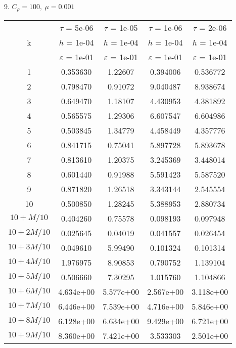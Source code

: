 9. $C_{\rho} = 100, \ \mu = 0.001$
\begin{center}
	\begin{tabular}{ |c|c|c|c|c| } 
		\hline
		& $\tau$ = 5e-06 & $\tau$ = 1e-05 & $\tau$ = 1e-06 & $\tau$ = 2e-06 \\ 
		k & $h$ = 1e-04 & $h$ = 1e-04 & $h$ = 1e-04 & $h$ = 1e-04 \\ 
		& $\varepsilon$ = 1e-01 & $\varepsilon$ = 1e-01 & $\varepsilon$ = 1e-01 & $\varepsilon$ = 1e-01 \\ 
		\hline
		1 & 0.353630 & 1.22607 & 0.394006 & 0.536772 \\
		\hline
		2 & 0.798470 & 0.91072 & 9.040487 & 8.938674 \\
		\hline
		3 & 0.649470 & 1.18107 & 4.430953 & 4.381892 \\
		\hline
		4 & 0.565575 & 1.29306 & 6.607547 & 6.604986 \\
		\hline
		5 & 0.503845 & 1.34779 & 4.458449 & 4.357776 \\
		\hline
		6 & 0.841715 & 0.75041 & 5.897728 & 5.893678 \\
		\hline
		7 & 0.813610 & 1.20375 & 3.245369 & 3.448014 \\
		\hline
		8 & 0.601440 & 0.91988 & 5.591423 & 5.587520 \\
		\hline
		9 & 0.871820 & 1.26518 & 3.343144 & 2.545554 \\
		\hline
		10 & 0.500850 & 1.28245 & 5.388953 & 2.880734 \\
		\hline
		$10 + M/10$ & 0.404260 & 0.75578 & 0.098193 & 0.097948 \\
		\hline
		$10 + 2M/10$ & 0.025645 & 0.04019 & 0.041557 & 0.026454 \\
		\hline
		$10 + 3M/10$ & 0.049610 & 5.99490 & 0.101324 & 0.101314 \\
		\hline
		$10 + 4M/10$ & 1.976975 & 8.90853 & 0.790752 & 1.139104 \\
		\hline
		$10 + 5M/10$ & 0.506660 & 7.30295 & 1.015760 & 1.104866 \\
		\hline
		$10 + 6M/10$ & 4.634e+00 & 5.577e+00 & 2.567e+00 & 3.118e+00 \\
		\hline
		$10 + 7M/10$ & 6.446e+00 & 7.539e+00 & 4.716e+00 & 5.846e+00 \\
		\hline
		$10 + 8M/10$ & 6.128e+00 & 6.634e+00 & 9.429e+00 & 6.721e+00 \\
		\hline
		$10 + 9M/10$ & 8.360e+00 & 7.421e+00 & 3.533303 & 2.501e+00 \\
		\hline
	\end{tabular}
\end{center}

